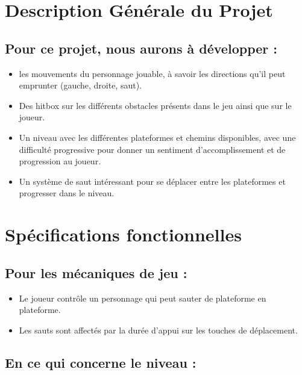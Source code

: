 \documentclass{report}
\begin{document}
\section{Description Générale du Projet}

\vspace{0.5cm}

\subsection{Pour ce projet, nous aurons à développer :}

\begin{itemize}[label={\textbf{--}}]
    \item les mouvements du personnage jouable, à savoir les directions qu’il peut emprunter (gauche, droite, saut).
    \item Des hitbox sur les différents obstacles présents dans le jeu ainsi que sur le joueur.
    \item Un niveau avec les différentes plateformes et chemins disponibles, avec une difficulté progressive pour donner un sentiment d’accomplissement et de progression au joueur.
    \item Un système de saut intéressant pour se déplacer entre les plateformes et progresser dans le niveau.
\end{itemize}

\vspace{1cm}

\section{Spécifications fonctionnelles}

\vspace{0.5cm}

\subsection{Pour les mécaniques de jeu :}

\begin{itemize}[label={\textbf{--}}]
    \item Le joueur contrôle un personnage qui peut sauter de plateforme en plateforme.
    \item Les sauts sont affectés par la durée d'appui sur les touches de déplacement.
\end{itemize}

\subsection{En ce qui concerne le niveau :}
\end{document}
